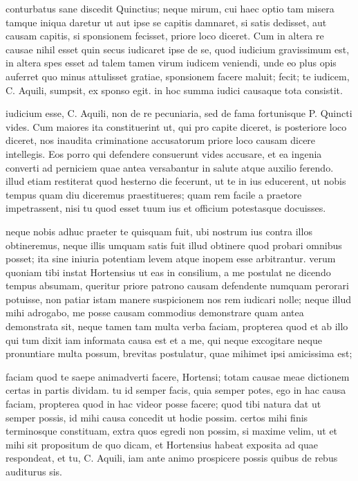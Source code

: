  conturbatus sane discedit Quinctius; neque mirum, cui haec optio tam misera tamque iniqua daretur ut aut ipse se capitis damnaret, si satis dedisset, aut causam capitis, si sponsionem fecisset, priore loco diceret. Cum in altera re causae nihil esset quin secus iudicaret ipse de se, quod iudicium gravissimum est, in altera spes esset ad talem tamen virum iudicem veniendi, unde eo plus opis auferret quo minus attulisset gratiae, sponsionem facere maluit; fecit; te iudicem, C. Aquili, sumpsit, ex sponso egit. in hoc summa iudici causaque tota consistit.

 iudicium esse, C. Aquili, non de re pecuniaria, sed de fama fortunisque P. Quincti vides. Cum maiores ita constituerint ut, qui pro capite diceret, is posteriore loco diceret, nos inaudita criminatione accusatorum priore loco causam dicere intellegis. Eos porro qui defendere consuerunt vides accusare, et ea ingenia converti ad perniciem quae antea versabantur in salute atque auxilio ferendo. illud etiam restiterat quod hesterno die fecerunt, ut te in ius educerent, ut nobis tempus quam diu diceremus praestitueres; quam rem facile a praetore impetrassent, nisi tu quod esset tuum ius et officium potestasque docuisses.

 neque nobis adhuc praeter te quisquam fuit, ubi nostrum ius contra illos obtineremus, neque illis umquam satis fuit illud obtinere quod probari omnibus posset; ita sine iniuria potentiam levem atque inopem esse arbitrantur. verum quoniam tibi instat Hortensius ut eas in consilium, a me postulat ne dicendo tempus absumam, queritur priore patrono causam defendente numquam perorari potuisse, non patiar istam manere suspicionem nos rem iudicari nolle; neque illud mihi adrogabo, me posse causam commodius demonstrare quam antea demonstrata sit, neque tamen tam multa verba faciam, propterea quod et ab illo qui tum dixit iam informata causa est et a me, qui neque excogitare neque pronuntiare multa possum, brevitas postulatur, quae mihimet ipsi amicissima est;

 faciam quod te saepe animadverti facere, Hortensi; totam causae meae dictionem certas in partis dividam. tu id semper facis, quia semper potes, ego in hac causa faciam, propterea quod in hac videor posse facere; quod tibi natura dat ut semper possis, id mihi causa concedit ut hodie possim. certos mihi finis terminosque constituam, extra quos egredi non possim, si maxime velim, ut et mihi sit propositum de quo dicam, et Hortensius habeat exposita ad quae respondeat, et tu, C. Aquili, iam ante animo prospicere possis quibus de rebus auditurus sis.


